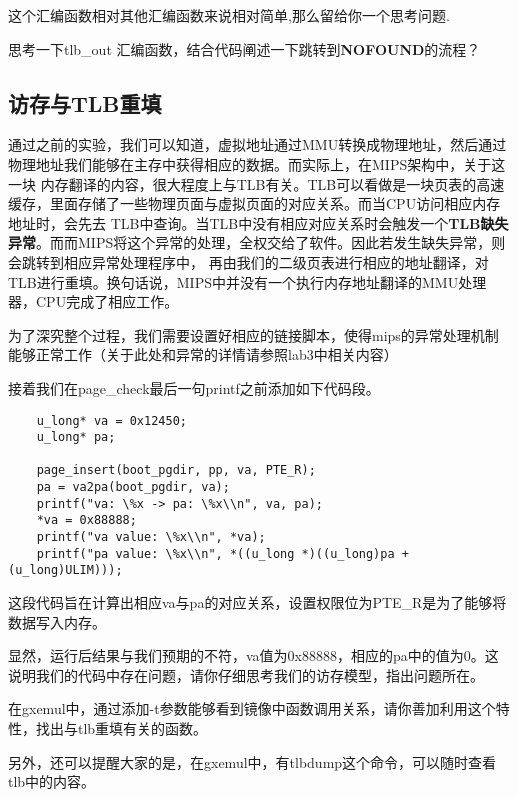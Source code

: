 这个汇编函数相对其他汇编函数来说相对简单,那么留给你一个思考问题.

\begin{thinking}\label{think-tlb}
思考一下tlb\_out 汇编函数，结合代码阐述一下跳转到\textbf{NOFOUND}的流程？
\end{thinking}
\subsection{访存与TLB重填}
  通过之前的实验，我们可以知道，虚拟地址通过MMU转换成物理地址，然后通过物理地址我们能够在主存中获得相应的数据。而实际上，在MIPS架构中，关于这一块
  内存翻译的内容，很大程度上与TLB有关。TLB可以看做是一块页表的高速缓存，里面存储了一些物理页面与虚拟页面的对应关系。而当CPU访问相应内存地址时，会先去
  TLB中查询。当TLB中没有相应对应关系时会触发一个\textbf{TLB缺失异常}。而而MIPS将这个异常的处理，全权交给了软件。因此若发生缺失异常，则会跳转到相应异常处理程序中，
  再由我们的二级页表进行相应的地址翻译，对TLB进行重填。换句话说，MIPS中并没有一个执行内存地址翻译的MMU处理器，CPU完成了相应工作。

  为了深究整个过程，我们需要设置好相应的链接脚本，使得mips的异常处理机制能够正常工作（关于此处和异常的详情请参照lab3中相关内容）

  接着我们在page\_check最后一句printf之前添加如下代码段。
  \begin{verbatim}
    u_long* va = 0x12450;
    u_long* pa;

    page_insert(boot_pgdir, pp, va, PTE_R);
    pa = va2pa(boot_pgdir, va);
    printf("va: \%x -> pa: \%x\\n", va, pa);
    *va = 0x88888;
    printf("va value: \%x\\n", *va);
    printf("pa value: \%x\\n", *((u_long *)((u_long)pa + (u_long)ULIM)));
  \end{verbatim}

  这段代码旨在计算出相应va与pa的对应关系，设置权限位为PTE\_R是为了能够将数据写入内存。
  \begin{thinking}\label{think-memory-access}
  显然，运行后结果与我们预期的不符，va值为0x88888，相应的pa中的值为0。这说明我们的代码中存在问题，请你仔细思考我们的访存模型，指出问题所在。
  \end{thinking}
  \begin{thinking}\label{think-tlb-refill}
  在gxemul中，通过添加-t参数能够看到镜像中函数调用关系，请你善加利用这个特性，找出与tlb重填有关的函数。
  \end{thinking}
  另外，还可以提醒大家的是，在gxemul中，有tlbdump这个命令，可以随时查看tlb中的内容。
